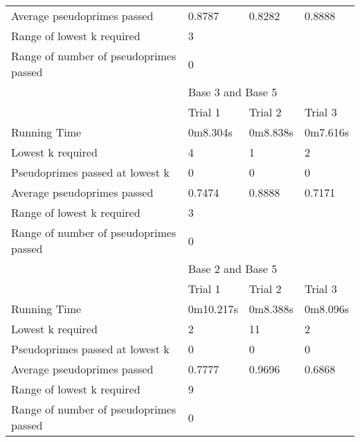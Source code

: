 \documentclass{article}
\begin{document}
\begin{appendices}
\begin{longtable}{llll}
Average pseudoprimes passed            & 0.8787    & 0.8282   & 0.8888          \\
\cmidrule(lr){2-4}
Range of lowest k required             & \multicolumn{3}{l}{3}                  \\
Range of number of pseudoprimes passed & \multicolumn{3}{l}{0}                  \\
\midrule
                                       & \multicolumn{3}{l}{Base 3 and Base 5}  \\
\midrule
                                       & Trial 1   & Trial 2  & Trial 3         \\
Running Time                           & 0m8.304s  & 0m8.838s & 0m7.616s        \\
Lowest k required                      & 4         & 1        & 2               \\
Pseudoprimes passed at lowest k        & 0         & 0        & 0               \\
Average pseudoprimes passed            & 0.7474    & 0.8888   & 0.7171          \\
\cmidrule(lr){2-4}
Range of lowest k required             & \multicolumn{3}{l}{3}                  \\
Range of number of pseudoprimes passed & \multicolumn{3}{l}{0}                  \\
\midrule
                                       & \multicolumn{3}{l}{Base 2 and Base 5}  \\
\midrule
                                       & Trial 1   & Trial 2  & Trial 3         \\
Running Time                           & 0m10.217s & 0m8.388s & 0m8.096s        \\
Lowest k required                      & 2         & 11       & 2               \\
Pseudoprimes passed at lowest k        & 0         & 0        & 0               \\
Average pseudoprimes passed            & 0.7777    & 0.9696   & 0.6868          \\
\cmidrule(lr){2-4}
Range of lowest k required             & \multicolumn{3}{l}{9}                  \\
Range of number of pseudoprimes passed & \multicolumn{3}{l}{0}                  \\
\bottomrule
\end{longtable}
\FloatBarrier


\end{appendices}
\end{document}
